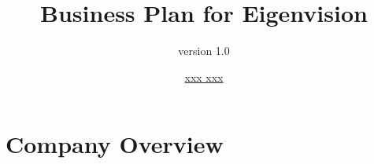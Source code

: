 \documentclass{beamer}
\title{Business Plan for Eigenvision}
\subtitle{version 1.0}
\author{\href{xxx}{xxx xxx}}
\newcommand{\hrefcol}[2]{\textcolor{cyan}{\href{#1}{#2}}}
\begin{document}
\maketitle

%
%
%
%



\section{Company Overview}

\end{document}
